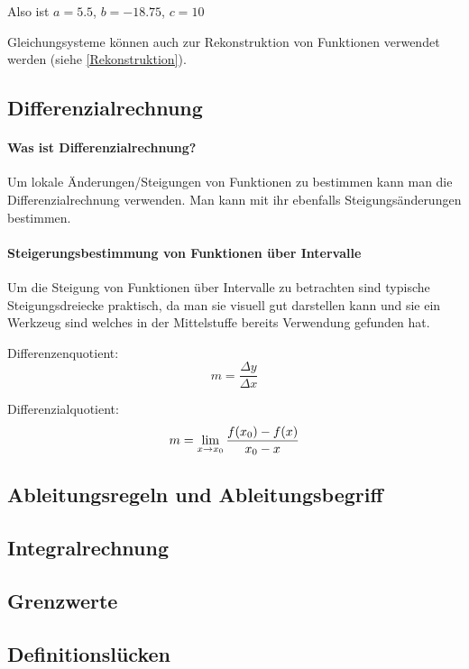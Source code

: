 \documentclass{article}
\begin{document}
Also ist $a=5.5$, $b=-18.75$, $c=10$

Gleichungsysteme können auch zur Rekonstruktion von Funktionen verwendet werden (siehe \ref{Rekonstruktion}). 

\subsection{Differenzialrechnung}
\paragraph{Was ist Differenzialrechnung?}

Um lokale Änderungen/Steigungen von Funktionen zu bestimmen kann man die Differenzialrechnung verwenden.
Man kann mit ihr ebenfalls Steigungsänderungen bestimmen.
\paragraph{Steigerungsbestimmung von Funktionen über Intervalle}

Um die Steigung von Funktionen über Intervalle zu betrachten sind typische Steigungsdreiecke praktisch,
da man sie visuell gut darstellen kann und sie ein Werkzeug sind welches in der Mittelstuffe bereits
Verwendung gefunden hat.

Differenzenquotient:
\[
    m = {\frac {\Delta y} {\Delta x}}
\]

Differenzialquotient:
\[
    m = \lim_{x \to x_{0}} {{f(x_{0}) - f(x)} \over { x_{0} - x}}
\]



\paragraph{}

\subsection{Ableitungsregeln und Ableitungsbegriff}\label{Ableitungen}
\subsection{Integralrechnung}\label{Integralrechnung}

\subsection{Grenzwerte}
\subsection{Definitionslücken}
\end{document}
